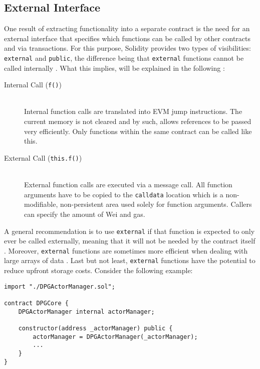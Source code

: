 \subsection{External Interface}
\label{sec:externalInterface}
One result of extracting functionality into a separate contract is the need for an external interface that specifies which functions can be called by other contracts and via transactions. For this purpose, Solidity provides two types of visibilities: \texttt{external} and \texttt{public}, the difference being that \texttt{external} functions cannot be called internally \cite[p.~77]{solidityDocs}. What this implies, will be explained in the following \cite[pp.~57, 69]{solidityDocs}:

\begin{description}
	\item[Internal Call (\texttt{f()})]
	\hfill \\
	Internal function calls are translated into \ac{EVM} jump instructions. The current memory is not cleared and by such, allows references to be passed very efficiently. Only functions within the same contract can be called like this.
	\item[External Call (\texttt{this.f()})]
	\hfill \\
	External function calls are executed via a message call. All function arguments have to be copied to the \texttt{calldata} location which is a non-modifiable, non-persistent area used solely for function arguments. Callers can specify the amount of Wei and gas. 
\end{description}

A general recommendation is to use \texttt{external} if that function is expected to only ever be called externally, meaning that it will not be needed by the contract itself \cite{externalPublic}. Moreover, \texttt{external} functions are sometimes more efficient when dealing with large arrays of data \cite[p.~77]{solidityDocs}. Last but not least, \texttt{external} functions have the potential to reduce upfront storage costs. Consider the following example:

\begin{lstlisting}[language=Solidity, caption=Sharing external contract interface via inheritance, label=lst:actorManagerReference]
import "./DPGActorManager.sol";

contract DPGCore {
	DPGActorManager internal actorManager;
	
	constructor(address _actorManager) public {
		actorManager = DPGActorManager(_actorManager);
		...
	}
}
\end{lstlisting}

